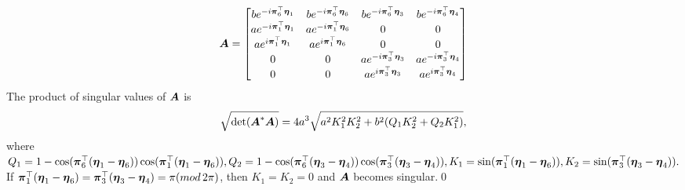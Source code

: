 $$\boldsymbol{A}=
\begin{bmatrix}
b e^{-i\boldsymbol{\pi}_6^\top\boldsymbol{\eta}_1} & b e^{-i\boldsymbol{\pi}_6^\top\boldsymbol{\eta}_6} & b e^{-i\boldsymbol{\pi}_6^\top\boldsymbol{\eta}_3} & b e^{-i\boldsymbol{\pi}_6^\top\boldsymbol{\eta}_4}\\
a e^{-i\boldsymbol{\pi}_1^\top\boldsymbol{\eta}_1} & a e^{-i\boldsymbol{\pi}_1^\top\boldsymbol{\eta}_6} & 0						& 0 \\
a e^{i\boldsymbol{\pi}_1^\top\boldsymbol{\eta}_1} & a e^{i\boldsymbol{\pi}_1^\top\boldsymbol{\eta}_6} & 0						& 0 \\
0 					& 0 					& a e^{-i\boldsymbol{\pi}_3^\top\boldsymbol{\eta}_3} & a e^{-i\boldsymbol{\pi}_3^\top\boldsymbol{\eta}_4}\\
0 					& 0 					& a e^{i\boldsymbol{\pi}_3^\top\boldsymbol{\eta}_3} & a e^{i\boldsymbol{\pi}_3^\top\boldsymbol{\eta}_4}\\
\end{bmatrix}
$$
The product of singular values of $\boldsymbol{A}$ is 
\begin{align}\label{eq: detB}
\sqrt{\text{det}(\boldsymbol{A}^* \boldsymbol{A})} = 4a^3\sqrt{a^2 K_1^2K_2^2 + b^2(Q_1K_2^2 + Q_2K_1^2)},
\end{align}
where $ Q_1 = 1 - \cos(\boldsymbol{\pi}_6^\top(\boldsymbol{\eta}_1-\boldsymbol{\eta}_6))\cos(\boldsymbol{\pi}_1^\top(\boldsymbol{\eta}_1-\boldsymbol{\eta}_6)), Q_2 = 1 - \cos(\boldsymbol{\pi}_6^\top(\boldsymbol{\eta}_3-\boldsymbol{\eta}_4))\cos(\boldsymbol{\pi}_3^\top(\boldsymbol{\eta}_3-\boldsymbol{\eta}_4)), K_1 = \sin(\boldsymbol{\pi}_1^\top(\boldsymbol{\eta}_1-\boldsymbol{\eta}_6)), K_2 = \sin(\boldsymbol{\pi}_3^\top(\boldsymbol{\eta}_3-\boldsymbol{\eta}_4)).$ If $\boldsymbol{\pi}_1^\top(\boldsymbol{\eta}_1-\boldsymbol{\eta}_6) = \boldsymbol{\pi}_3^\top(\boldsymbol{\eta}_3-\boldsymbol{\eta}_4) = \pi (mod\, 2\pi)$, then $K_1 = K_2 = 0$ and $\boldsymbol{A}$ becomes singular.\qed

